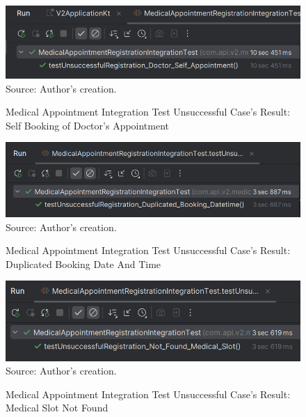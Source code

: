 \begin{figure}[H]
	\centering
	\caption{Medical Appointment Integration Test Unsuccessful Case's Result: Self Booking of Doctor's Appointment}
	\includegraphics[width=1\linewidth]{figures/medical_appointment_registration_integration_test_unsuccessful_result_doctor_self_appointment.png}
	\label{medical_appointment_registration_integration_test_unsuccessful_result_doctor_self_appointment}
	\footnotesize Source: Author's creation.
\end{figure}

\begin{figure}[H]
	\centering
	\caption{Medical Appointment Integration Test Unsuccessful Case's Result: Duplicated Booking Date And Time}
	\includegraphics[width=1\linewidth]{figures/medical_appointment_registration_integration_test_unsuccessful_result_duplicated_booking_datetime.png}
	\label{medical_appointment_registration_integration_test_unsuccessful_result_duplicated_booking_datetime}
	\footnotesize Source: Author's creation.
\end{figure}

\begin{figure}[H]
	\centering
	\caption{Medical Appointment Integration Test Unsuccessful Case's Result: Medical Slot Not Found}
	\includegraphics[width=1\linewidth]{figures/medical_appointment_registration_integration_test_unsuccessful_result_medical_slot_not_found.png}
	\label{medical_appointment_registration_integration_test_unsuccessful_result_medical_slot_not_found}
	\footnotesize Source: Author's creation.
\end{figure}

